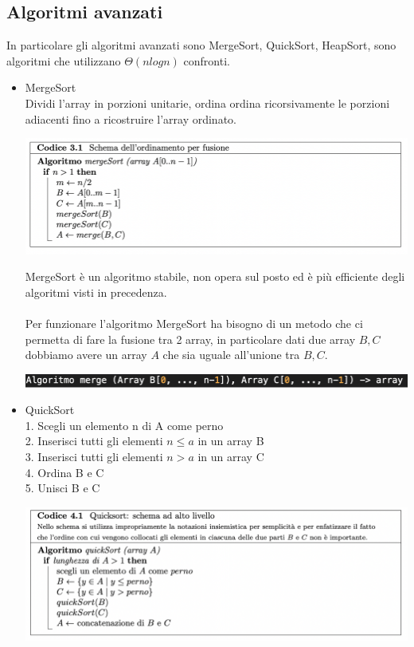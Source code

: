 \documentclass[11pt, oneside]{article}   	%
\begin{document}
\subsection{Algoritmi avanzati}
In particolare gli algoritmi avanzati sono MergeSort, QuickSort, HeapSort, sono algoritmi che utilizzano $\Theta(nlogn)$ confronti.
\begin{itemize}
\item MergeSort\\
Dividi l'array in porzioni unitarie, ordina ordina ricorsivamente le porzioni adiacenti fino a ricostruire l'array ordinato. 
\begin{center}
\includegraphics[scale=0.8]{mergsort}
\end{center}
MergeSort è un algoritmo stabile, non opera sul posto ed è più efficiente degli algoritmi visti in precedenza.\\ \\Per funzionare l'algoritmo MergeSort ha bisogno di un metodo che ci permetta di fare la fusione tra 2 array, in particolare dati due array $B, C$ dobbiamo avere un array $A$ che sia uguale all'unione tra $B, C$.\begin{center}
\includegraphics[scale=0.8]{merge}
\end{center}
\item QuickSort\\
1. Scegli un elemento n di A come perno\\
2. Inserisci tutti gli elementi $n \leq a$ in un array B\\
3. Inserisci tutti gli elementi $n > a$ in un array C\\
4. Ordina B e C\\
5. Unisci B e C
\begin{center}
\includegraphics[scale=0.8]{quicksort}

\end{center}
\end{itemize}
\end{document}
